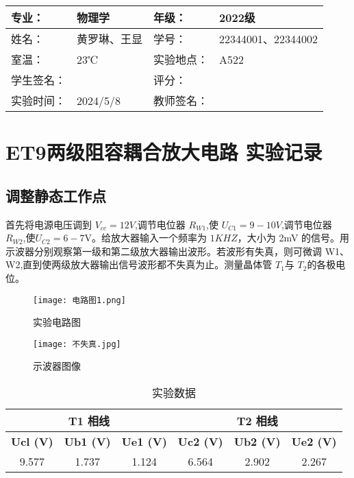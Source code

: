 \documentclass[dvipsnames, svgnames,a4paper,11pt]{article}
\begin{document}
	
	
	
	\clearpage
	
	\begin{table}
		\renewcommand\arraystretch{1.7}
		\centering
		\begin{tabularx}{\textwidth}{|X|X|X|X|}
			\hline
			专业： & 物理学 & 年级： & 2022级 \\
			\hline
			姓名： & 黄罗琳、王显 & 学号： &22344001、22344002 \\
			\hline
			室温： &23℃  & 实验地点： & A522 \\
			\hline
			学生签名：&  & 评分： &\\
			\hline
			实验时间：& 2024/5/8 & 教师签名：&\\
			\hline
		\end{tabularx}
	\end{table}
	
	\section{ET9两级阻容耦合放大电路 \quad\heiti 实验记录}
	
	\subsection{调整静态工作点}
	首先将电源电压调到 $V_{cc}=12V$,调节电位器 $R_{W1}$,使
$U_{C1}=9-10V$,调节电位器 $R_{W2}$,使$U_{C2}=6-7$V。给放大器输入一个频率为
$1KHZ$，大小为 2mV 的信号。用示波器分别观察第一级和第二级放大器输出波形。若波形有失真，则可微调 W1、W2,直到使两级放大器输出信号波形都不失真为止。测量晶体管 $T_1$与 $T_2$的各极电位。
	\begin{figure}[{H}]
		\centering
		\texttt{[image: 电路图1.png]}
		\caption{实验电路图}
		\label{}
	\end{figure}
	\begin{figure}[{H}]
		\centering
		\texttt{[image: 不失真.jpg]}
		\caption{示波器图像}
		\label{}
	\end{figure}
	\begin{table}[h]
		\centering
		\caption{实验数据}
	\begin{tabular}{|c|c|c|c|c|c|}
	
		\hline
		  \multicolumn{3}{|c|}{\textbf{T1 相线}} & \multicolumn{3}{|c|}{\textbf{T2 相线}}\\
		\hline
		\textbf{Ucl (V)} & \textbf{Ub1 (V)} & \textbf{Ue1 (V)} & \textbf{Uc2 (V)} & \textbf{Ub2 (V)}&  \textbf{Ue2 (V)}\\
		\hline
		9.577&1.737 &1.124 &6.564 &2.902 &2.267\\
		\hline
		\end{tabular}
	\end{table}
\end{document}
